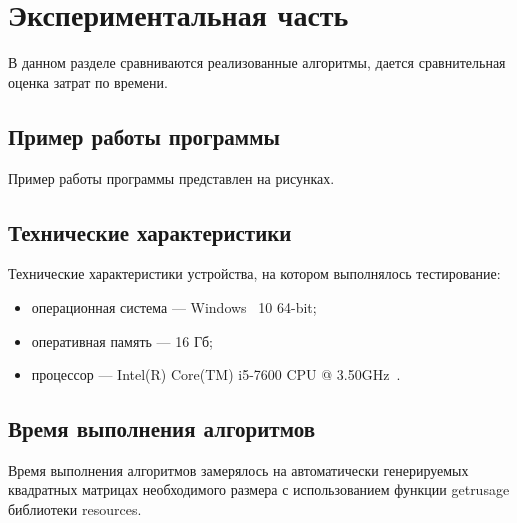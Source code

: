 \documentclass[12pt]{report}
\begin{document}
    \chapter{Экспериментальная часть}
    В данном разделе сравниваются реализованные алгоритмы, дается сравнительная оценка затрат по времени.


    \section{Пример работы программы}
    Пример работы программы представлен на рисунках.
    


    \section{Технические характеристики}
    Технические характеристики устройства, на котором выполнялось тестирование:
    \begin{itemize}
        \item операционная система --- Windows~\cite{windows} 10 64-bit;
        \item оперативная память --- 16 Гб;
        \item процессор --- Intel(R) Core(TM) i5-7600 CPU @ 3.50GHz~\cite{i5}.
    \end{itemize}


    \section{Время выполнения алгоритмов}

    Время выполнения алгоритмов замерялось на автоматически генерируемых
    квадратных матрицах необходимого размера с использованием функции getrusage библиотеки resources.
\end{document}
